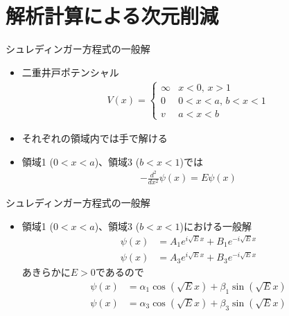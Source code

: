 \section{解析計算による次元削減}

\begin{frame}[t,fragile]{シュレディンガー方程式の一般解}
  \begin{itemize}
  \item 二重井戸ポテンシャル
    \begin{align*}
      V(x) = \begin{cases}
        \infty & \text{$x < 0$, $x > 1$} \\
        0 & \text{$0 < x < a$, $b < x < 1$} \\
        v & \text{$a < x < b$}
      \end{cases}
    \end{align*}
  \item それぞれの領域内では手で解ける
  \item 領域1 ($0 < x < a$)、領域3 ($b < x < 1$)では
    \begin{align*}
      -\frac{d^2}{dx^2}\psi(x) = E\psi(x)
    \end{align*}
  \end{itemize}
\end{frame}

\begin{frame}[t,fragile]{シュレディンガー方程式の一般解}
  \begin{itemize}
  \item 領域1 ($0 < x < a$)、領域3 ($b < x < 1$)における一般解
    \begin{align*}
      \psi(x) &= A_1 e^{i\sqrt{E}x} + B_1 e^{-i\sqrt{E}x} \\
      \psi(x) &= A_3 e^{i\sqrt{E}x} + B_3 e^{-i\sqrt{E}x}
    \end{align*}
    あきらかに$E>0$であるので
    \begin{align*}
      \psi(x) &= \alpha_1 \cos(\sqrt{E}x) + \beta_1 \sin(\sqrt{E}x) \\
      \psi(x) &= \alpha_3 \cos(\sqrt{E}x) + \beta_3 \sin(\sqrt{E}x)
    \end{align*}
  \end{itemize}
\end{frame}

